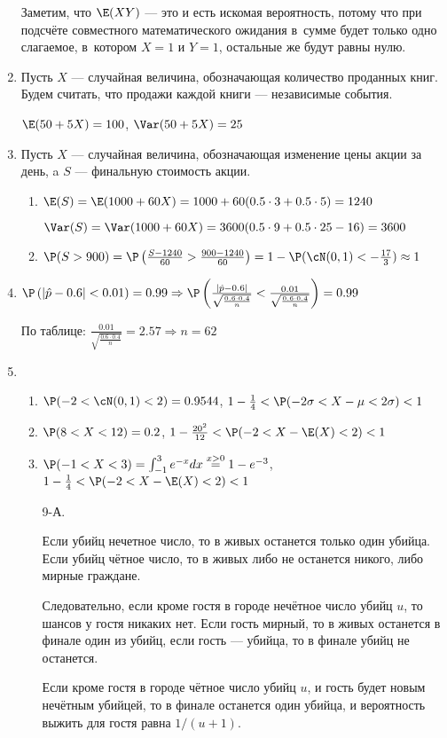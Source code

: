 \begin{enumerate}
Заметим, что $\E(XY)$ — это и есть искомая вероятность, потому что при подсчёте
совместного математического ожидания в~сумме будет только одно слагаемое, в~котором
$X = 1$ и $Y = 1$, остальные же будут равны нулю.
\item Пусть $X$ — случайная величина, обозначающая количество проданных книг.
Будем считать, что продажи каждой книги — независимые события.

$\E(50 + 5X) = 100$, $\Var(50 + 5X) = 25$
\item Пусть $X$ — случайная величина, обозначающая изменение цены акции за день,
a $S$ —  финальную стоимость акции.
\begin{enumerate}
\item $\E(S) = \E(1000 + 60X) = 1000 + 60 (0.5 \cdot 3 + 0.5 \cdot 5) = 1240$

$\Var(S) = \Var(1000 + 60X) = 3600(0.5 \cdot 9 + 0.5 \cdot 25 - 16) = 3600$
\item $\P(S > 900) = \P\left(\frac{S-1240}{60} > \frac{900-1240}{60} \right) =
1 - \P(\cN(0,1)< -\frac{17}{3}) \approx 1$
\end{enumerate}
\item $\P\left(|\hat{p} - 0.6| <0.01\right) = 0.99 \Rightarrow \P\left(\frac{|\hat{p}
- 0.6|}{\sqrt{\frac{0.6\cdot0.4}{n}}} < \frac{0.01}{\sqrt{\frac{0.6\cdot0.4}{n}}} \right) = 0.99 $

По таблице: $\frac{0.01}{\sqrt{\frac{0.6\cdot0.4}{n}}}  = 2.57 \Rightarrow n = 62$
\item
\begin{enumerate}
\item $\P(-2 < \cN(0,1) < 2) = 0.9544$, $1 - \frac{1}{4} < \P(-2\sigma<X-\mu<2\sigma) < 1$
\item $\P(8<X<12) = 0.2$, $1 - \frac{20^2}{12} < \P(-2 < X - \E(X) < 2)< 1$
\item $\P(-1 < X < 3) = \int_{-1}^{3} e^{-x} dx \stackrel{x>0}{=} 1 - e^{-3}$, $1- \frac{1}{4} < \P(-2<X-\E(X)<2) < 1$

\item[9-А.]

Если убийц нечетное число, то в живых останется только один убийца.
Если убийц чётное число, то в живых либо не останется никого, либо мирные граждане.

Следовательно, если кроме гостя в городе нечётное число убийц $u$, то шансов у гостя
никаких нет. Если гость мирный, то в живых останется в финале один из убийц,
если гость — убийца, то в финале убийц не останется.

Если кроме гостя в городе чётное число убийц $u$, и гость будет новым нечётным убийцей,
то в финале останется один убийца, и вероятность выжить для гостя равна $1/(u+1)$.


\end{enumerate}
\end{enumerate}

